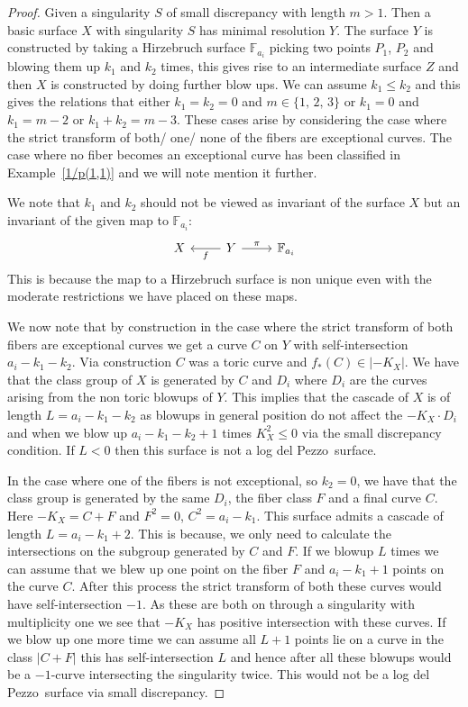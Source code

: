 \documentclass[12pt]{amsbook}
\theoremstyle{plain}
\newcommand{\ldp}{log del Pezzo}
\newcommand{\mb}[1]{\mathbb{#1}}
\begin{document}
\begin{proof}
Given a singularity $S$ of small discrepancy with length $m>1$. Then a basic surface $X$ with singularity $S$ has minimal resolution $Y$. The surface $Y$ is constructed by taking a Hirzebruch surface $\mb{F}_{a_i}$ picking two points $P_1$, $P_2$ and blowing them up $k_1$ and $k_2$ times, this gives rise to an intermediate surface $Z$ and then $X$ is constructed by doing further blow ups. We can assume $k_1 \leq k_2$ and this gives the relations that either $k_1 = k_2 = 0$ and $m \in \{1, \, 2, \, 3 \}$ or $k_1 = 0$ and $k_1 = m-2$ or $k_1 + k_2 = m-3$. These cases arise by considering the case where the strict transform of both/ one/ none of the fibers are exceptional curves. The case where no fiber becomes an exceptional curve has been classified in Example~\ref{1/p(1,1)} and we will note mention it further.


We note that $k_1$ and $k_2$ should not be viewed as invariant of the surface $X$ but an invariant of the given map to $\mb{F}_{a_i}$:
\[
\begin{tikzcd}
X & Y \arrow[l, "f"] \arrow[r, "\pi"] & \mb{F}_{a_i}
\end{tikzcd}
\]
This is because the map to a Hirzebruch surface is non unique even with the moderate restrictions we have placed on these maps.


We now note that by construction in the case where the strict transform of both fibers are exceptional curves we get a curve $C$ on $Y$ with self-intersection $a_i - k_1 -k_2$. Via construction $C$ was a toric curve and $f_*(C) \in |-K_X|$. We have that the class group of $X$ is generated by $C$ and $D_i$ where $D_i$ are the curves arising from the non toric blowups of $Y$. This implies that the cascade of $X$ is of length $L = a_i - k_1-k_2$  as blowups in general position do not affect the $-K_X \cdot D_i$ and when we blow up $a_i - k_1 -k_2 +1$ times $K_X^2 \leq 0$ via the small discrepancy condition. If $L < 0$ then this surface is not a \ldp\ surface.


In the case where one of the fibers is not exceptional, so $k_2  = 0$,  we have that the class group is generated by the same $D_i$, the fiber class $F$ and a final curve $C$. Here $-K_X = C + F$ and $F^2 = 0$, $C^2 =  a_i - k_1$. This surface admits a cascade of length $L = a_i - k_1 + 2$. This is because, we only need to calculate the intersections on the subgroup generated by $C$ and $F$. If we blowup $L$ times we can assume that we blew up one point on the fiber $F$ and $a_i-k_1+1$ points on the curve $C$. After this process the strict transform of both these curves would have self-intersection $-1$. As these are both on through a singularity with multiplicity one we see that $-K_X$ has positive intersection with these curves. If we blow up one more time we can assume all $L+1$ points lie on a curve in the class $|C+F|$ this has self-intersection $L$ and hence after all these blowups would be a $-1$-curve intersecting the singularity twice. This would not be a \ldp\ surface via small discrepancy.



\end{proof}
\end{document}

